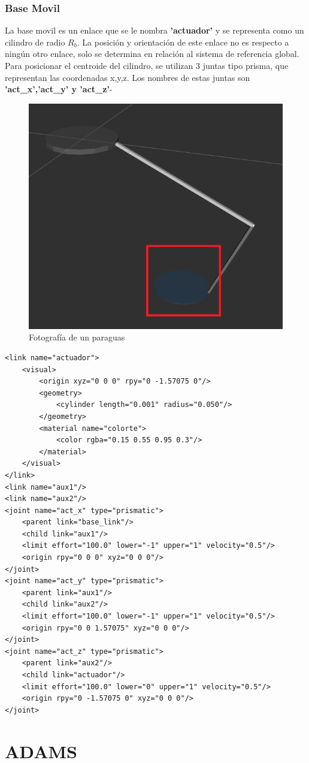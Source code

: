 \begin{lstlisting}
        \end{lstlisting}
       

       \subsubsection{Base Movil}

        La base movil es un enlace que se le nombra \textbf{'actuador'} y se representa como un cilindro de radio \textbf{$R_b$}. La posición y orientación de este enlace no es respecto a ningún otro enlace, solo se determina en relación al sistema de referencia global. Para posicionar el centroide del cilindro, se utilizan 3 juntas tipo prisma, que representan las coordenadas x,y,z. Los nombres de estas juntas son \textbf{'act\_x','act\_y' y 'act\_z'}-

        \begin{figure}[h]
                \centering
                \includegraphics[width=0.4\linewidth]{Main/Chapter6/Images6/cap6_basemovil.png}
                \caption{Fotografía de un paraguas}
                \label{f:Cap6_urdf_4}
            \end{figure}

        \lstset{language=XML}
        \begin{lstlisting}
<link name="actuador">
	<visual>
		<origin xyz="0 0 0" rpy="0 -1.57075 0"/>
		<geometry>
			<cylinder length="0.001" radius="0.050"/>
		</geometry>
		<material name="colorte">
			<color rgba="0.15 0.55 0.95 0.3"/>
		</material>
	</visual>
</link>
<link name="aux1"/>
<link name="aux2"/>
<joint name="act_x" type="prismatic">
	<parent link="base_link"/>
	<child link="aux1"/>
	<limit effort="100.0" lower="-1" upper="1" velocity="0.5"/>
	<origin rpy="0 0 0" xyz="0 0 0"/>
</joint>
<joint name="act_y" type="prismatic">
	<parent link="aux1"/>
	<child link="aux2"/>
	<limit effort="100.0" lower="-1" upper="1" velocity="0.5"/>
	<origin rpy="0 0 1.57075" xyz="0 0 0"/>
</joint>
<joint name="act_z" type="prismatic">
	<parent link="aux2"/>
	<child link="actuador"/>
	<limit effort="100.0" lower="0" upper="1" velocity="0.5"/>
	<origin rpy="0 -1.57075 0" xyz="0 0 0"/>
</joint>
        \end{lstlisting}

      \newpage
  
  





    \newpage


\section{ADAMS}

